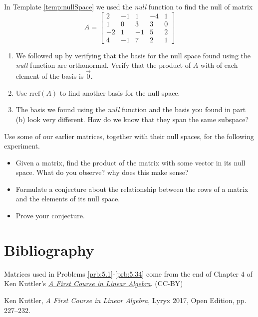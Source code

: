 \documentclass{ximera}
\begin{document}

\begin{problem}\label{prob_oct_Rn1}
    In Template \ref{temp:nullSpace} we used the \emph{null} function to find the null of matrix $$A=\begin{bmatrix}2&-1&1&-4&1\\1&0&3&3&0\\-2&1&-1&5&2\\4&-1&7&2&1\end{bmatrix}$$ 

    \begin{enumerate}
        \item We followed up by verifying that the basis for the null space found using the \emph{null} function are orthonormal.  Verify that the product of $A$ with of each element of the basis is $\vec{0}$.
        \item Use $\text{rref}(A)$ to find another basis for the null space.  
        \item The basis we found using the \emph{null} function and the basis you found in part (b) look very different.  How do we know that they span the same subspace?
    \end{enumerate}
\end{problem}

\begin{problem}\label{prob_oct_Rn2}
    Use some of our earlier matrices, together with their null spaces, for the following experiment.
    \begin{itemize}
        \item Given a matrix, find the product of the matrix with some vector in its null space.  What do you observe?  why does this make sense?
        \item Formulate a conjecture about the relationship between the rows of a matrix and the elements of its null space.
        \item Prove your conjecture.
    \end{itemize}
\end{problem}

\section*{Bibliography}
Matrices used in Problems \ref{prb:5.1}-\ref{prb:5.34} come from the end of Chapter 4 of Ken Kuttler's \href{https://open.umn.edu/opentextbooks/textbooks/a-first-course-in-linear-algebra-2017}{\it A First Course in Linear Algebra}. (CC-BY)

Ken Kuttler, {\it  A First Course in Linear Algebra}, Lyryx 2017, Open Edition, pp. 227--232.  
\end{document}
